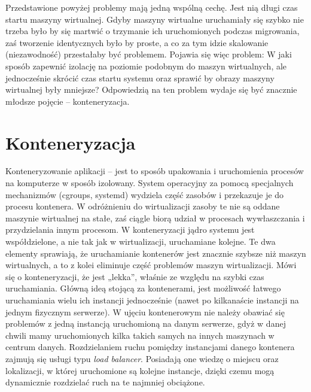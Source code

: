 \documentclass[10pt,a4paper,titlepage,twoside]{report}
\begin{document}
\indent \indent Przedstawione powyżej problemy mają jedną wspólną cechę. Jest nią długi czas startu maszyny wirtualnej. Gdyby maszyny wirtualne uruchamiały się szybko nie trzeba było by się martwić o trzymanie ich uruchomionych podczas migrowania, zaś tworzenie identycznych było by proste, a co za tym idzie skalowanie (niezawodność) przestałaby być problemem. Pojawia się więc problem: W jaki sposób zapewnić izolację na poziomie podobnym do maszyn wirtualnych, ale jednocześnie skrócić czas startu systemu oraz sprawić by obrazy maszyny wirtualnej były mniejsze? Odpowiedzią na ten problem wydaje się być znacznie młodsze pojęcie – konteneryzacja.

\section{Konteneryzacja}
\indent \indent Konteneryzowanie aplikacji – jest to sposób upakowania i uruchomienia procesów na komputerze w sposób izolowany. System operacyjny za pomocą specjalnych mechanizmów (cgroups, systemd) wydziela część zasobów i przekazuje je do procesu kontenera. W odróżnieniu do wirtualizacji zasoby te nie są oddane maszynie wirtualnej na stałe, zaś ciągle biorą udział w procesach wywłaszczania i przydzielania innym procesom. W konteneryzacji jądro systemu jest współdzielone, a nie tak jak w wirtualizacji, uruchamiane kolejne. Te dwa elementy sprawiają, że uruchamianie kontenerów jest znacznie szybsze niż maszyn wirtualnych\cite{ad21}, a to z kolei eliminuje część problemów maszyn wirtualizacji. Mówi się o konteneryzacji, że jest „lekka”, właśnie ze względu na szybki czas uruchamiania. Główną ideą stojącą za kontenerami, jest możliwość łatwego uruchamiania wielu ich instancji jednocześnie (nawet po kilkanaście instancji na jednym fizycznym serwerze). W ujęciu kontenerowym nie należy obawiać się problemów z jedną instancją uruchomioną na danym serwerze, gdyż w danej chwili mamy uruchomionych kilka takich samych na innych maszynach w centrum danych. Rozdzielaniem ruchu pomiędzy instancjami danego kontenera zajmują się usługi typu \textit{load balancer}. Posiadają one wiedzę o miejscu oraz lokalizacji, w której uruchomione są kolejne instancje, dzięki czemu mogą dynamicznie rozdzielać ruch na te najmniej obciążone.
\end{document}
